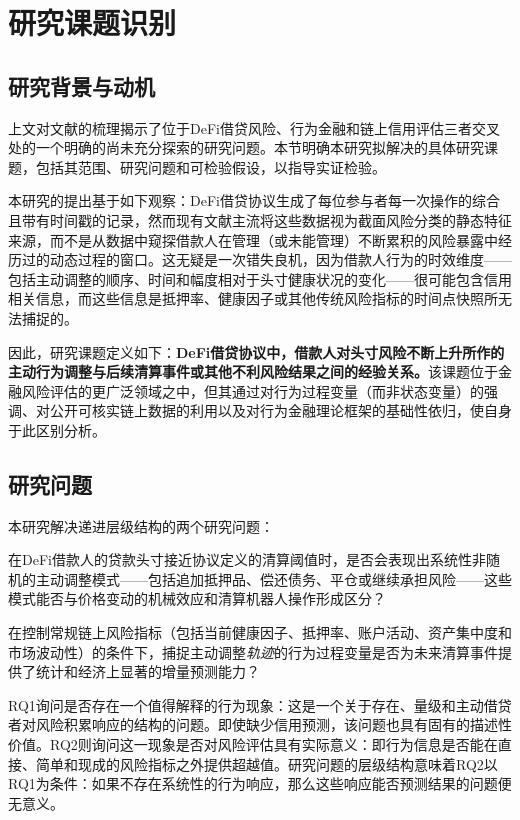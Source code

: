 \section{研究课题识别}

\subsection{研究背景与动机}

上文对文献的梳理揭示了位于DeFi借贷风险、行为金融和链上信用评估三者交叉处的一个明确的尚未充分探索的研究问题。本节明确本研究拟解决的具体研究课题，包括其范围、研究问题和可检验假设，以指导实证检验。

本研究的提出基于如下观察：DeFi借贷协议生成了每位参与者每一次操作的综合且带有时间戳的记录，然而现有文献主流将这些数据视为截面风险分类的静态特征来源，而不是从数据中窥探借款人在管理（或未能管理）不断累积的风险暴露中经历过的动态过程的窗口。这无疑是一次错失良机，因为借款人行为的时效维度——包括主动调整的顺序、时间和幅度相对于头寸健康状况的变化——很可能包含信用相关信息，而这些信息是抵押率、健康因子或其他传统风险指标的时间点快照所无法捕捉的。

因此，研究课题定义如下：\textbf{DeFi借贷协议中，借款人对头寸风险不断上升所作的主动行为调整与后续清算事件或其他不利风险结果之间的经验关系。}该课题位于金融风险评估的更广泛领域之中，但其通过对行为过程变量（而非状态变量）的强调、对公开可核实链上数据的利用以及对行为金融理论框架的基础性依归，使自身于此区别分析。

\subsection{研究问题}

本研究解决递进层级结构的两个研究问题：

\begin{description}[leftmargin=*,labelindent=\parindent, itemindent=0pt]
\item[RQ1（行为层面）。] 在DeFi借款人的贷款头寸接近协议定义的清算阈值时，是否会表现出系统性非随机的主动调整模式——包括追加抵押品、偿还债务、平仓或继续承担风险——这些模式能否与价格变动的机械效应和清算机器人操作形成区分？

\item[RQ2（信用层面）。] 在控制常规链上风险指标（包括当前健康因子、抵押率、账户活动、资产集中度和市场波动性）的条件下，捕捉主动调整\emph{轨迹}的行为过程变量是否为未来清算事件提供了统计和经济上显著的增量预测能力？
\end{description}

RQ1询问是否存在一个值得解释的行为现象：这是一个关于存在、量级和主动借贷者对风险积累响应的结构的问题。即使缺少信用预测，该问题也具有固有的描述性价值。RQ2则询问这一现象是否对风险评估具有实际意义：即行为信息是否能在直接、简单和现成的风险指标之外提供超越值。研究问题的层级结构意味着RQ2以RQ1为条件：如果不存在系统性的行为响应，那么这些响应能否预测结果的问题便无意义。

